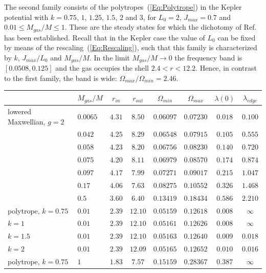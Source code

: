 The second family consists of the polytropes~(\ref{Eq:Polytrope}) in the Kepler potential with $k = 0.75$, $1$, $1.25$, $1.5$, $2$ and $3$, for $L_0 = 2$, $J_{max} = 0.7$ and $0.01\leq M_{gas}/M\leq 1$. These are the steady states for which the dichotomy of Ref.~\cite{mHgRmScS25} has been established. Recall that in the Kepler case the value of $L_0$ can be fixed by means of the rescaling~(\ref{Eq:Rescaling}), such that this family is characterized by $k$, $J_{max}/L_0$ and $M_{gas}/M$. In the limit $M_{gas}/M\to 0$ the frequency band is $[0.0508,0.125]$ and the gas occupies the shell $2.4 < r < 12.2$. Hence, in contrast to the first family, the band is wide: $\Omega_{max}/\Omega_{min} = 2.46$.

\begin{table}[htp]
\begin{center}
\begin{tabular}{ll|cc|cc|cc}
\hline\hline
 & $M_{gas}/M$ & $r_{in}$ & $r_{out}$ & $\Omega_{min}$ & $\Omega_{max}$ & $\lambda(0)$ & $\lambda_{edge}$ \\
\hline
lowered Maxwellian, $g = 2$ & $0.0065$ & $4.31$ & $8.50$ & $0.06097$ & $0.07230$ & $0.018$ & $0.100$ \\
 & $0.042$ & $4.25$ & $8.29$ & $0.06548$ & $0.07915$ & $0.105$ & $0.555$ \\
 & $0.058$ & $4.23$ & $8.20$ & $0.06756$ & $0.08230$ & $0.140$ & $0.720$ \\
 & $0.075$ & $4.20$ & $8.11$ & $0.06979$ & $0.08570$ & $0.174$ & $0.874$ \\
 & $0.097$ & $4.17$ & $7.99$ & $0.07271$ & $0.09017$ & $0.215$ & $1.047$ \\
 & $0.17$ & $4.06$ & $7.63$ & $0.08275$ & $0.10552$ & $0.326$ & $1.468$ \\
 & $0.5$ & $3.60$ & $6.40$ & $0.13419$ & $0.18434$ & $0.586$ & $2.210$ \\
\hline
polytrope, $k = 0.75$ & $0.01$ & $2.39$ & $12.10$ & $0.05159$ & $0.12618$ & $0.008$ & $\infty$ \\
\phantom{polytrope,} $k = 1$ & $0.01$ & $2.39$ & $12.10$ & $0.05161$ & $0.12626$ & $0.008$ & $\infty$ \\
\phantom{polytrope,} $k = 1.5$ & $0.01$ & $2.39$ & $12.10$ & $0.05163$ & $0.12640$ & $0.009$ & $0.018$ \\
\phantom{polytrope,} $k = 2$ & $0.01$ & $2.39$ & $12.09$ & $0.05165$ & $0.12652$ & $0.010$ & $0.016$ \\
\hline
polytrope, $k = 0.75$ & $1$ & $1.83$ & $7.57$ & $0.15159$ & $0.28367$ & $0.387$ & $\infty$ \\

\end{tabular}
\end{center}
\end{table}
